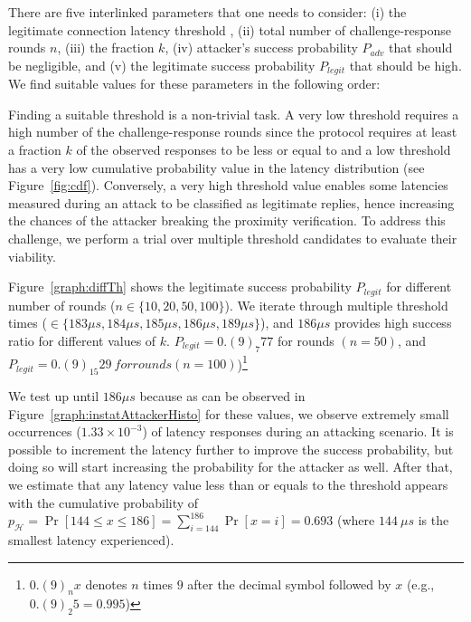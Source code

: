 There are five interlinked parameters that one needs to consider: (i) the legitimate connection latency threshold \connect, (ii) total number of challenge-response rounds $n$, (iii) the fraction $k$, (iv) attacker's success probability $P_{adv}$ that should be negligible, and (v) the legitimate success probability $P_{legit}$ that should be high. We find suitable values for these parameters in the following order:



\newcommand{\mainResultCaption}{\textbf{Distinguishing relay attack.} The attacker's success probability $P_{adv}$ and the legitimate success probability $P_{legit}$ in proximity verification for different number of rounds ($n$) given a fixed $k=0.4$.}


 Finding a suitable threshold \connect is a non-trivial task. A very low threshold requires a high number of the challenge-response rounds since the protocol requires at least a fraction $k$ of the observed responses to be less or equal to \connect and a low threshold has a very low cumulative probability value in the latency distribution (see Figure~\ref{fig:cdf}). Conversely, a very high threshold value enables some latencies measured during an attack to be classified as legitimate replies, hence increasing the chances of the attacker breaking the proximity verification. To address this challenge, we perform a trial over multiple threshold candidates to evaluate their viability.


Figure~\ref{graph:diffTh} shows the legitimate success probability $P_{legit}$ for different number of rounds ($n\in\{10,20,50,100\}$). We iterate through multiple threshold times (\connect$\in\{183\mu s,184\mu s,185\mu s, 186\mu s, 189\mu s\}$), and $186\mu s$ provides high success ratio for different values of $k$. $P_{legit}=0.(9)_7 77$ for rounds $(n=50)$, and $P_{legit}=0.(9)_15 29\ for rounds (n=100)$)\footnote{$0.(9)_n x$ denotes $n$ times $9$ after the decimal symbol followed by $x$ (e.g., $0.(9)_2 5=0.995$)}

We test \connect up until $186 \mu s$ because as can be observed in Figure~\ref{graph:instatAttackerHisto} for these values, we observe extremely small occurrences ($1.33\times10^{-3}$) of latency responses during an attacking scenario. It is possible to increment the latency further to improve the success probability, but doing so will start increasing the probability for the attacker as well. 
%
After that, we estimate that any latency value less than or equals to the threshold \connect appears with the cumulative probability of $p_{\mathcal{H}} = \Pr[144\leq x \leq 186] = \sum_{i=144}^{186}\Pr[x=i] = 0.693$ (where $144\ \mu s$ is the smallest latency experienced).

